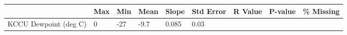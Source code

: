\documentclass[11pt]{article}
\begin{document}
\begin{longtable}[]{@{}lllllllll@{}}
\toprule
\begin{minipage}[b]{0.25\columnwidth}\raggedright\strut
\strut
\end{minipage} & \begin{minipage}[b]{0.06\columnwidth}\raggedright\strut
Max\strut
\end{minipage} & \begin{minipage}[b]{0.06\columnwidth}\raggedright\strut
Min\footnotemark{}\strut
\end{minipage}
\footnotetext{} &
\begin{minipage}[b]{0.08\columnwidth}\raggedright\strut
Mean\footnotemark{}\strut
\end{minipage}
\footnotetext{} &
\begin{minipage}[b]{0.05\columnwidth}\raggedright\strut
Slope\strut
\end{minipage} & \begin{minipage}[b]{0.07\columnwidth}\raggedright\strut
Std Error\strut
\end{minipage} & \begin{minipage}[b]{0.06\columnwidth}\raggedright\strut
R Value\strut
\end{minipage} & \begin{minipage}[b]{0.06\columnwidth}\raggedright\strut
P-value\strut
\end{minipage} & \begin{minipage}[b]{0.07\columnwidth}\raggedright\strut
\% Missing\strut
\end{minipage}\tabularnewline
\midrule
\endhead
\begin{minipage}[t]{0.25\columnwidth}\raggedright\strut
KCCU Dewpoint (deg C)\strut
\end{minipage} & \begin{minipage}[t]{0.06\columnwidth}\raggedright\strut
0\strut
\end{minipage} & \begin{minipage}[t]{0.06\columnwidth}\raggedright\strut
-27\strut
\end{minipage} & \begin{minipage}[t]{0.08\columnwidth}\raggedright\strut
-9.7\strut
\end{minipage} & \begin{minipage}[t]{0.05\columnwidth}\raggedright\strut
0.085\strut
\end{minipage} & \begin{minipage}[t]{0.07\columnwidth}\raggedright\strut
0.03\strut

\end{minipage}
\end{longtable}
\end{document}

